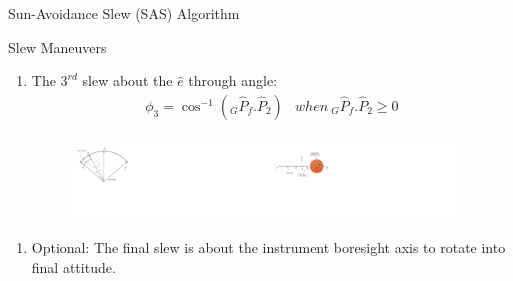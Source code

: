 \documentclass{beamer}
\begin{document}
\begin{frame}{Sun-Avoidance Slew (SAS) Algorithm}
\begin{block}{Slew Maneuvers}
\begin{enumerate}[3]
\item The $3^{rd}$ slew about the $\hat{e}$ through angle:
\begin{equation}
	\begin{array}{lr}
	\phi_3 = \cos^{-1}(_G\hat{P}_f.\hat{P}_2) & {\scriptstyle when} \  _G\hat{P}_f.\hat{P}_2\geq 0\\
	\end{array}
\end{equation}
\begin{figure}
\includegraphics[width=2in]{./Figures/SVAS_4r}\includegraphics[width=2in]{./Figures/SVAS_4r_modified.pdf}
\end{figure}
\end{enumerate}
\begin{enumerate}[4]
\item Optional: The final slew is about the instrument boresight axis to rotate into final attitude. 
\end{enumerate}
\end{block}
\end{frame}
%
%
\end{document}
